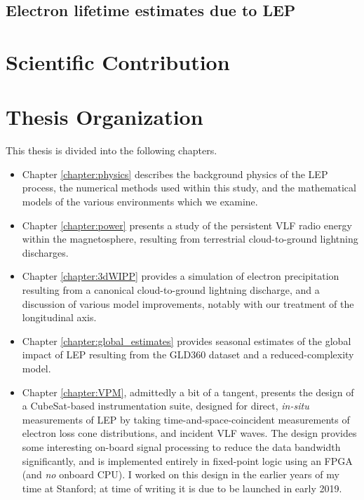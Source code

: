 \subsection{Electron lifetime estimates due to LEP}


\section{Scientific Contribution}

\section{Thesis Organization}
This thesis is divided into the following chapters.
\begin{itemize}
\item Chapter \ref{chapter:physics} describes the background physics of the LEP process, the numerical methods used within this study, and the mathematical models of the various environments which we examine. 
\item Chapter \ref{chapter:power} presents a study of the persistent VLF radio energy within the magnetosphere, resulting from terrestrial cloud-to-ground lightning discharges. 
\item Chapter \ref{chapter:3dWIPP} provides a simulation of electron precipitation resulting from a canonical cloud-to-ground lightning discharge, and a discussion of various model improvements, notably with our treatment of the longitudinal axis. 
\item Chapter \ref{chapter:global_estimates} provides seasonal estimates of the global impact of LEP resulting from the GLD360 dataset and a reduced-complexity model. \item Chapter \ref{chapter:VPM}, admittedly a bit of a tangent, presents the design of a CubeSat-based instrumentation suite, designed for direct, \emph{in-situ} measurements of LEP by taking time-and-space-coincident measurements of electron loss cone distributions, and incident VLF waves. The design provides some interesting on-board signal processing to reduce the data bandwidth significantly, and is implemented entirely in fixed-point logic using an FPGA (and \emph{no} onboard CPU). I worked on this design in the earlier years of my time at Stanford; at time of writing it is due to be launched in early 2019.
\end{itemize}

